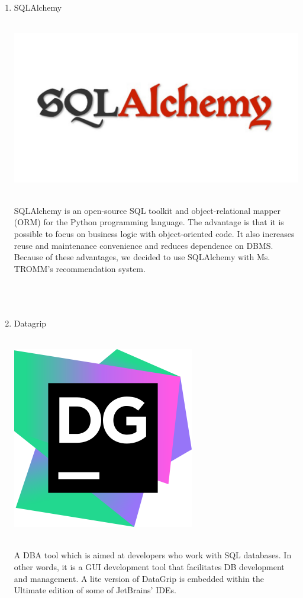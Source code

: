 \documentclass[conference]{IEEEtran}
\begin{document}
\begin{enumerate}
    \item SQLAlchemy \\ \\
    \centerline{\includegraphics[scale=0.1]{assets/sqlalchemy.jpg}}
    \\ SQLAlchemy is an open-source SQL toolkit and object-relational mapper (ORM) for the Python programming language. The advantage is that it is possible to focus on business logic with object-oriented code. It also increases reuse and maintenance convenience and reduces dependence on DBMS. Because of these advantages, we decided to use SQLAlchemy with Ms. TROMM's recommendation system.\\ \\ \\ \\ 
    
    \item Datagrip \\ \\
    \centerline{\includegraphics[scale=0.5]{assets/datagrip.png}}
    \\ A DBA tool which is aimed at developers who work with SQL databases. In other words, it is a GUI development tool that facilitates DB development and management. A lite version of DataGrip is embedded within the Ultimate edition of some of JetBrains' IDEs.\\ \\ \\ \\ 
    

\end{enumerate}
\end{document}
